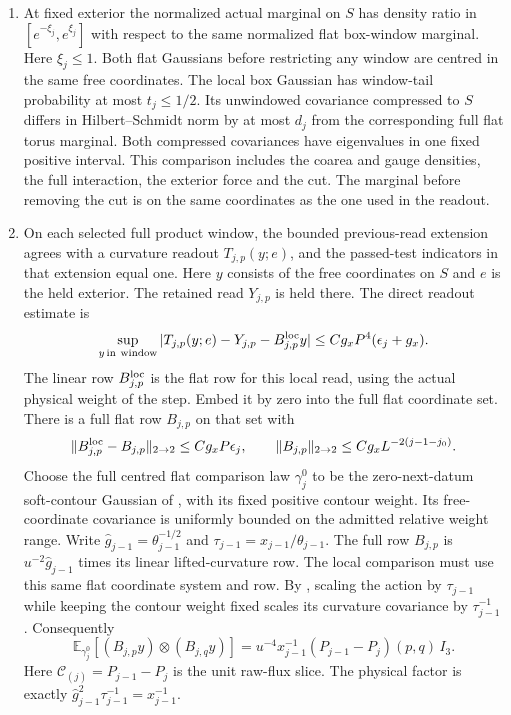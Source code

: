 \documentclass[11pt,letterpaper,reqno]{amsart}
\numberwithin{equation}{section}
\theoremstyle{definition}
\theoremstyle{remark}
\begin{document}
\begin{enumerate}
\item At fixed exterior the normalized actual marginal on $S$
has density ratio in $[e^{-\xi_j},e^{\xi_j}]$ with respect to the
same normalized flat box-window marginal. Here $\xi_j\le1$.
Both flat Gaussians before restricting any window are centred
in the same free coordinates. The local box Gaussian has
window-tail probability at most $t_j\le1/2$. Its unwindowed
covariance compressed to $S$ differs in Hilbert--Schmidt norm by
at most $d_j$ from the corresponding full flat torus marginal.
Both compressed covariances have eigenvalues in one fixed
positive interval. This comparison includes the coarea and
gauge densities, the full interaction, the exterior force and
the cut. The marginal before removing the cut is on the same
coordinates as the one used in the readout.

\item On each selected full product window, the bounded
previous-read extension agrees with a curvature readout
\(T_{j,p}(y;e)\), and the passed-test indicators in that
extension equal one. Here \(y\) consists of the free coordinates
on \(S\) and \(e\) is the held exterior. The retained read
\(Y_{j,p}\) is held there. The direct readout estimate is
\begin{equation}\label{fp:eq-direct-readout}
 \sup_{y\,\mathrm{in\ window}}
 |T_{j,p}(y;e)-Y_{j,p}-B^{\rm loc}_{j,p}y|
       \le Cg_xP^4(\epsilon_j+g_x).
\end{equation}
The linear row $B^{\rm loc}_{j,p}$ is the
flat row for this local read, using the actual physical
weight of the step. Embed it by zero into the full flat
coordinate set. There is a full flat row $B_{j,p}$ on that
set with
\[
 \|B^{\rm loc}_{j,p}-B_{j,p}\|_{2\to2}\le Cg_xP\epsilon_j,
 \qquad \|B_{j,p}\|_{2\to2}
             \le Cg_x L^{-2(j-1-j_0)} .
\]
Choose the full centred flat comparison law
\(\gamma_j^0\) to be the zero-next-datum soft-contour Gaussian
of \cite[Proposition~3.3]{GI}, with its fixed positive contour
weight. Its free-coordinate covariance is uniformly bounded
on the admitted relative weight range. Write
\(\widehat g_{j-1}=\theta_{j-1}^{-1/2}\) and
\(\tau_{j-1}=x_{j-1}/\theta_{j-1}\).
The full row \(B_{j,p}\) is \(u^{-2}\widehat g_{j-1}\) times
its linear lifted-curvature row. The local comparison must use
this same flat coordinate system and row. By
\cite[Propositions~3.3 and~4.3]{GI}, scaling the action by
\(\tau_{j-1}\) while keeping the contour weight fixed scales
its curvature covariance by \(\tau_{j-1}^{-1}\). Consequently
\begin{equation}\label{fp:eq-slice-covariance}
 \mathbb E_{\gamma_j^0}
       [(B_{j,p}y)\otimes(B_{j,q}y)]
 =u^{-4} x_{j-1}^{-1}(P_{j-1}-P_j)(p,q)\,I_3.
\end{equation}
Here \(\mathcal C_{(j)}=P_{j-1}-P_j\) is the unit raw-flux
slice. The physical factor is exactly
\(\widehat g_{j-1}^2\tau_{j-1}^{-1}=x_{j-1}^{-1}\).


\end{enumerate}
\end{document}

